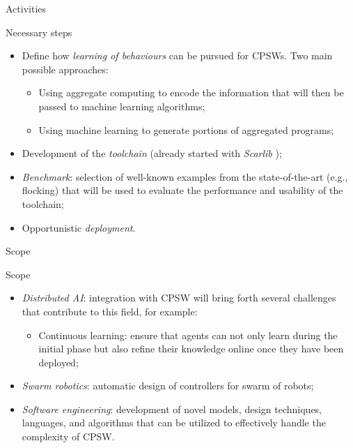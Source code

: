 \documentclass[presentation]{beamer}\mode<presentation>{\usetheme{AMSBolognaFC}}
\begin{document}
\begin{frame}[c]{Activities}

\begin{block}{Necessary steps}
	\begin{itemize}
		\item Define how \emph{learning of behaviours} can be pursued for CPSWs. 
			Two main possible approaches:
			\begin{itemize}
				\item Using aggregate computing to encode the information that will then be 
					passed to machine learning algorithms;
				\item Using machine learning to generate portions of aggregated programs;
			\end{itemize}
		\item Development of the \emph{toolchain} (already started with \emph{Scarlib} \cite{scarlib});
		\item \emph{Benchmark}: selection of well-known examples from the state-of-the-art (e.g., flocking) 
			that will be used to evaluate the performance and usability of the toolchain;
		\item Opportunistic \emph{deployment}.
	\end{itemize}
\end{block}
	
\end{frame}

\begin{frame}[c]{Scope}

\begin{block}{Scope}
	\begin{itemize}
		\item \emph{Distributed AI}: integration with CPSW will bring forth several challenges that contribute
		to this field, for example:
		\begin{itemize}
			\item Continuous learning: ensure that agents can not only learn during the initial phase but also
				refine their knowledge online once they have been deployed;
		\end{itemize}
		\item \emph{Swarm robotics}: automatic design of controllers for swarm of robots;
		\item \emph{Software engineering}: development of novel models, 
			design techniques, languages, and algorithms that can be utilized to
			effectively handle the complexity of CPSW.
	\end{itemize}
\end{block}


\end{frame}
\end{document}
